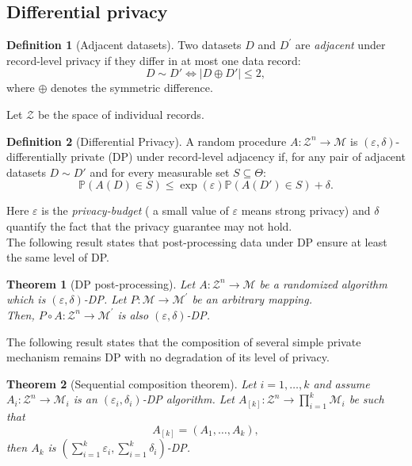 \documentclass[10pt,a4paper]{book}
\theoremstyle{definition}
\newtheorem{defn}{Definition}[section]
\theoremstyle{plain}
\newtheorem{thm}{Theorem}[section]
\theoremstyle{remark}
\newcommand{\Prob}{\mathbb{P}}
\newcommand \M {\mathcal{M}}
\begin{document}
\subsection{Differential privacy}
\begin{defn}[Adjacent datasets]
Two datasets $D$ and $D^{\prime}$ are \emph{adjacent} under record-level privacy if they differ in at most one data record:
$$D\sim D' \iff |D\oplus D'|\leq 2,$$
where $\oplus$ denotes the symmetric difference. 
\end{defn}
Let $\mathcal{Z}$ be the space of individual records.
\begin{defn}[Differential Privacy]
A random  procedure $A:\mathcal{Z}^{n}\to \M$ is $(\varepsilon,\delta)$-differentially private (DP) under record-level adjacency if, for any pair of adjacent datasets $D\sim D'$ and for every measurable set $S\subseteq\Theta$:
$$\Prob\left(A(D)\in S\right)\leq \exp(\varepsilon)\Prob(A(D')\in S)+\delta.$$
\end{defn}
Here $\varepsilon$ is the \emph{privacy-budget} ( a small value of $\varepsilon$ means strong privacy) and $\delta$ quantify the fact that the privacy guarantee may not hold.\\ The following result states that post-processing data under DP ensure at least the same level of DP.
\begin{thm}[DP post-processing]
Let $A:\mathcal{Z}^{n}\to \M$ be a randomized algorithm which is $(\varepsilon,\delta)$-DP. Let $P:\M \to \M^{\prime}$ be an arbitrary mapping. \\ Then, $P\circ A: \mathcal{Z}^{n}\to \mathcal{M}^{\prime}$ is also $(\varepsilon,\delta)$-DP.
\end{thm}

The following result states that the composition of several simple private mechanism remains DP with no degradation of its level of privacy.
\begin{thm}[Sequential composition theorem]
Let $i=1,\dots, k$ and assume $A_i:\mathcal{Z}^{n}\to \M_i$ is an $(\varepsilon_i,\delta_i)$-DP algorithm. Let $A_{[k]}:\mathcal{Z}^{n}\to \prod_{i=1}^{k}\mathcal{M}_i$ be such that
$$A_{[k]}=(A_{1},\dots, A_k),$$
then
$A_{k}$ is $\left(\sum_{i=1}^{k}\varepsilon_i,\sum_{i=1}^{k}\delta_i\right)$-DP.
\end{thm}
\end{document}
